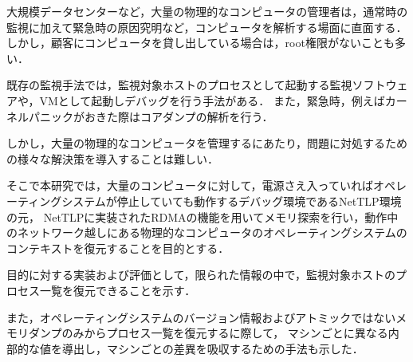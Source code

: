 \begin{jabstract}

大規模データセンターなど，大量の物理的なコンピュータの管理者は，通常時の監視に加えて緊急時の原因究明など，コンピュータを解析する場面に直面する．
しかし，顧客にコンピュータを貸し出している場合は，root権限がないことも多い．

既存の監視手法では，監視対象ホストのプロセスとして起動する監視ソフトウェアや，VMとして起動しデバッグを行う手法がある．
また，緊急時，例えばカーネルパニックがおきた際はコアダンプの解析を行う．

しかし，大量の物理的なコンピュータを管理するにあたり，問題に対処するための様々な解決策を導入することは難しい．

そこで本研究では，大量のコンピュータに対して，電源さえ入っていればオペレーティングシステムが停止していても動作するデバッグ環境であるNetTLP\cite{246316}環境の元，
NetTLPに実装されたRDMAの機能を用いてメモリ探索を行い，動作中のネットワーク越しにある物理的なコンピュータのオペレーティングシステムのコンテキストを復元することを目的とする．

目的に対する実装および評価として，限られた情報の中で，監視対象ホストのプロセス一覧を復元できることを示す．

また，オペレーティングシステムのバージョン情報およびアトミックではないメモリダンプのみからプロセス一覧を復元するに際して，
マシンごとに異なる内部的な値を導出し，マシンごとの差異を吸収するための手法も示した．

\end{jabstract}
